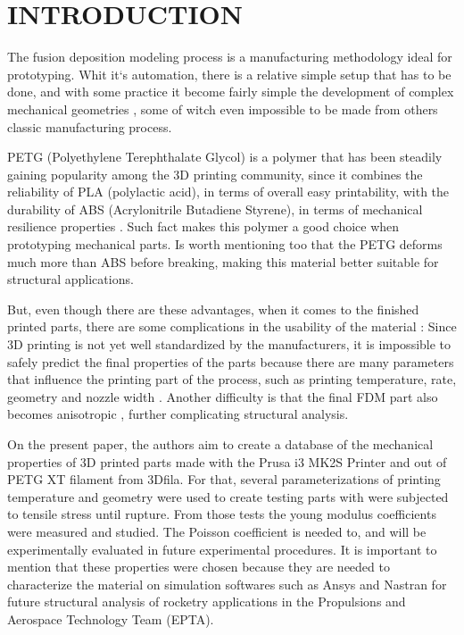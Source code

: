 \documentclass[10pt,fleqn,a4paper,twoside]{article}
\begin{document}
\section{INTRODUCTION}

The fusion deposition modeling process is a manufacturing methodology ideal for prototyping. Whit it`s automation, there is a relative simple setup that has to be done, and with some practice it become fairly simple the development of complex mechanical geometries \citep{fdm_today}, some of witch even impossible to be made from others classic manufacturing process.   

PETG (Polyethylene Terephthalate Glycol) is a polymer that has been steadily gaining popularity among the 3D printing community, since it combines the reliability of PLA (polylactic acid), in terms of overall easy printability, with the durability of ABS (Acrylonitrile Butadiene Styrene), in terms of mechanical resilience properties \citep{tiposfilamento}. Such fact makes this polymer a good choice when prototyping mechanical parts. Is worth mentioning too that the PETG deforms much more than ABS before breaking, making this material better suitable for structural applications. 

But, even though there are these advantages, when it comes to the finished printed parts, there are some complications in the usability of the material \citep{3Dcomplication}: Since 3D printing is not yet well standardized by the manufacturers, it is impossible to safely predict the final properties of the parts because there are many parameters that influence the printing part of the process, such as printing temperature, rate, geometry and nozzle width \citep{ABS_PLA_today}. Another difficulty is that the final FDM part also becomes anisotropic \citep{PETG}, further complicating structural analysis. 

On the present paper, the authors aim to create a database of the mechanical properties of 3D printed parts made with the Prusa i3 MK2S Printer and out of PETG XT filament from 3Dfila. For that, several parameterizations of printing temperature and geometry were used to create testing parts with were subjected to tensile stress until rupture. From those tests the young modulus coefficients were measured and studied. The Poisson coefficient is needed to, and will be experimentally evaluated in future experimental procedures. It is important to mention that these properties were chosen because they are needed to characterize the material on simulation softwares such as Ansys and Nastran for future structural analysis of rocketry applications in the Propulsions and Aerospace Technology Team (EPTA).  
\end{document}
